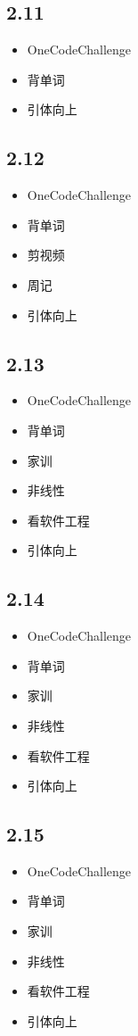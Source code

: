 \documentclass[UTF8]{ctexart}
\begin{document}
\subsection*{2.11}
\begin{itemize}
    \item OneCodeChallenge
    \item 背单词
    \item 引体向上
\end{itemize}

\subsection*{2.12}
\begin{itemize}
    \item OneCodeChallenge
    \item 背单词
    \item 剪视频
    \item 周记
    \item 引体向上
\end{itemize}

\subsection*{2.13}
\begin{itemize}
    \item OneCodeChallenge
    \item 背单词
    \item 家训
    \item 非线性
    \item 看软件工程
    \item 引体向上
\end{itemize}

\subsection*{2.14}
\begin{itemize}
    \item OneCodeChallenge
    \item 背单词
    \item 家训
    \item 非线性
    \item 看软件工程
    \item 引体向上
\end{itemize}

\subsection*{2.15}
\begin{itemize}
    \item OneCodeChallenge
    \item 背单词
    \item 家训
    \item 非线性
    \item 看软件工程
    \item 引体向上
\end{itemize}
\end{document}
